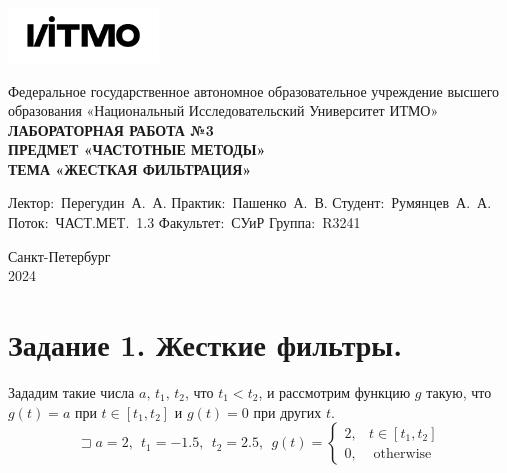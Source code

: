 \documentclass[a4paper, 12pt]{article}
\begin{document}
    \begin{titlepage}

        \begin{center}
        \includegraphics[width=0.3\textwidth]{itmo.png} %
        \vfill
        
        Федеральное государственное автономное образовательное учреждение высшего образования
        «Национальный Исследовательский Университет ИТМО»\\
        
        \vfill
        {\large\bf ЛАБОРАТОРНАЯ РАБОТА №3}\\
        {\large\bf ПРЕДМЕТ «ЧАСТОТНЫЕ МЕТОДЫ»}\\
        {\large\bf ТЕМА «ЖЕСТКАЯ ФИЛЬТРАЦИЯ»}
        \vfill

        \begin{flushright}
            \begin{minipage}{.45\textwidth}
            {
                \hbox{Лектор: Перегудин А. А.}
                \hbox{Практик: Пашенко А. В.}
                \hbox{Студент: Румянцев А. А.}
                \hbox{Поток: ЧАСТ.МЕТ. 1.3}
                \hbox{}
                \hbox{Факультет: СУиР}
                \hbox{Группа: R3241}
            }
            \end{minipage}
        \end{flushright}
        
        \vfill
                
        Санкт-Петербург\\
        2024
        \end{center}
    \end{titlepage}
    
    \tableofcontents

    \newpage
    \section{Задание 1. Жесткие фильтры.}
    Зададим такие числа $a,\,t_1,\,t_2$, что $t_1<t_2$, и рассмотрим функцию $g$ такую, что
    $g(t)=a$ при $t\in[t_1,t_2]$ и $g(t)=0$ при других $t$. $$\sqsupset a=2,\ \ t_1=-1.5,\ \ t_2=2.5,\ \ g(t)=
    \begin{cases}
        2, & t\in[t_1,t_2]\\
        0, & \text{ otherwise}
    \end{cases}
    $$
\end{document}
